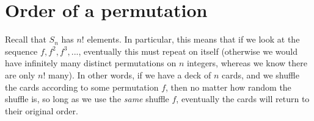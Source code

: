 \documentclass[11pt,dvipsnames]{book}
\numberwithin{figure}{section} %
\numberwithin{table}{section} %
\begin{document}
%



%
%
%
%
%
%
%
%








\section{Order of a permutation}

Recall that $S_{n}$ has $n!$ elements. In particular, this means that if we look at the sequence $f,f^{2},f^{3},...$, eventually this must repeat on itself (otherwise we would have infinitely many distinct permutations on $n$ integers, whereas we know there are only $n!$ many). In other words, if we have a deck of $n$ cards, and we shuffle the cards according to some permutation $f$, then no matter how random the shuffle is, so long as we use the {\it same} shuffle $f$, eventually the cards will return to their original order. 
\end{document}
